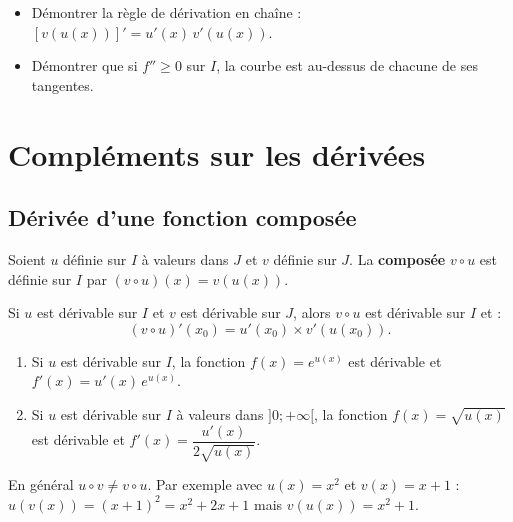 \documentclass[11pt,a4paper,openany]{book}
\theoremstyle{definition}
\begin{document}
    \begin{demoprogbox}
    \begin{itemize}
        \item Démontrer la règle de dérivation en chaîne : $[v(u(x))]'=u'(x)\,v'(u(x))$.
        \item Démontrer que si $f''\geq 0$ sur $I$, la courbe est au-dessus de chacune de ses tangentes.
    \end{itemize}
    \end{demoprogbox}

    \section{Compléments sur les dérivées}
    \subsection{Dérivée d'une fonction composée}
    \begin{Définition}
        Soient $u$ définie sur $I$ à valeurs dans $J$ et $v$ définie sur $J$.
        La \textbf{composée} $v\circ u$ est définie sur $I$ par $(v\circ u)(x)=v(u(x))$.
    \end{Définition}

    \begin{Propriété}
        Si $u$ est dérivable sur $I$ et $v$ est dérivable sur $J$, alors $v\circ u$ est
        dérivable sur $I$ et :
        \[
            (v\circ u)'(x_0)=u'(x_0)\times v'(u(x_0)).
        \]
    \end{Propriété}

    \begin{Propriété}
        \begin{enumerate}
            \item Si $u$ est dérivable sur $I$, la fonction $f(x)=e^{u(x)}$ est dérivable
                  et $f'(x)=u'(x)\,e^{u(x)}$.
            \item Si $u$ est dérivable sur $I$ à valeurs dans $]0;+\infty[$, la fonction
                  $f(x)=\sqrt{u(x)}$ est dérivable et $f'(x)=\dfrac{u'(x)}{2\sqrt{u(x)}}$.
        \end{enumerate}
    \end{Propriété}

    \begin{Remarque}
        En général $u\circ v\neq v\circ u$. Par exemple avec $u(x)=x^2$ et $v(x)=x+1$ :
        $u(v(x))=(x+1)^2=x^2+2x+1$ mais $v(u(x))=x^2+1$.
    \end{Remarque}
\end{document}
